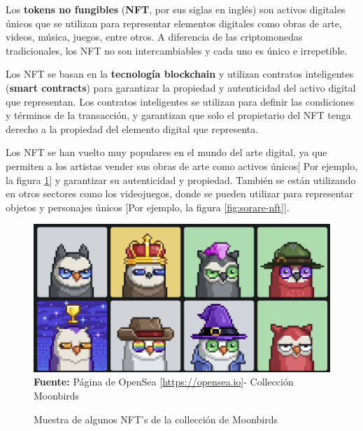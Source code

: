 Los \textbf{tokens no fungibles} (\textbf{NFT}, por sus siglas en inglés) son 
activos digitales únicos que se utilizan para representar elementos digitales 
como obras de arte, videos, música, juegos, entre otros. A diferencia de las 
criptomonedas tradicionales, los NFT no son intercambiables y cada uno es 
único e irrepetible.

Los NFT se basan en la \textbf{tecnología blockchain} y utilizan contratos 
inteligentes (\textbf{smart contracts}) para garantizar la propiedad y 
autenticidad del activo digital que representan. Los contratos inteligentes 
se utilizan para definir las condiciones y términos de la transacción, y 
garantizan que solo el propietario del NFT tenga derecho a la propiedad del 
elemento digital que representa.

Los NFT se han vuelto muy populares en el mundo del arte digital, ya que 
permiten a los artistas vender sus obras de arte como activos únicos[ 
Por ejemplo, la figura \ref*{fig:opensea-nft}] y garantizar su 
autenticidad y propiedad. También se están utilizando en otros sectores como 
los videojuegos, donde se pueden utilizar para representar objetos y personajes 
únicos [Por ejemplo, la figura \ref*{fig:sorare-nft}].

\begin{figure}[htb!]
    \caption{Muestra de algunos NFT's de la collección de Moonbirds}
    \label{fig:opensea-nft}
    \centering
    \includegraphics[scale=0.25]{./Ilustraciones/opensea-nft.png}\\
    \textbf{Fuente:} Página de OpenSea [\url{https://opensea.io}]- Collección Moonbirds
\end{figure}

